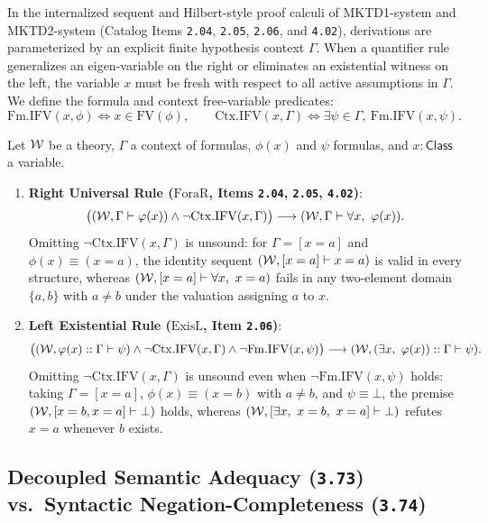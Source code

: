 In the internalized sequent and Hilbert-style proof calculi of \textsf{MKTD1-system} and \textsf{MKTD2-system} (Catalog Items \texttt{2.04}, \texttt{2.05}, \texttt{2.06}, and \texttt{4.02}), derivations are parameterized by an explicit finite hypothesis context $\Gamma$. When a quantifier rule generalizes an eigen-variable on the right or eliminates an existential witness on the left, the variable $x$ must be fresh with respect to all active assumptions in $\Gamma$. We define the formula and context free-variable predicates:
\[
\mathrm{Fm.IFV}(x, \phi) \iff x \in \mathrm{FV}(\phi),
\qquad
\mathrm{Ctx.IFV}(x, \Gamma) \iff \exists \psi \in \Gamma,\ \mathrm{Fm.IFV}(x, \psi).
\]

\begin{proposition}
\label{prop:ctx_ifv_quantifier_hygiene}
Let ${\mathcal{W}}$ be a theory, $\Gamma$ a context of formulas, $\phi(x)$ and $\psi$ formulas, and $x:\mathsf{Class}$ a variable.
\begin{enumerate}
  \item \textbf{Right Universal Rule ($\mathrm{ForaR}$, Items \texttt{2.04}, \texttt{2.05}, \texttt{4.02})}:
  \[
  \big(({\mathcal{W}}, \Gamma \vdash \varphi(x)) \land \neg \mathrm{Ctx.IFV}(x, \Gamma)\big)
  \longrightarrow
  ({\mathcal{W}}, \Gamma \vdash \forall x,\ \varphi(x)).
  \]
  Omitting $\neg \mathrm{Ctx.IFV}(x, \Gamma)$ is unsound: for $\Gamma = [x = a]$ and $\phi(x) \equiv (x = a)$, the identity sequent $({\mathcal{W}}, [x = a] \vdash x = a)$ is valid in every structure, whereas $({\mathcal{W}}, [x = a] \vdash \forall x,\ x = a)$ fails in any two-element domain $\{a, b\}$ with $a \neq b$ under the valuation assigning $a$ to $x$.
  \item \textbf{Left Existential Rule ($\mathrm{ExisL}$, Item \texttt{2.06})}:
  \[
  \big(({\mathcal{W}}, \varphi(x) :: \Gamma \vdash \psi) \land \neg \mathrm{Ctx.IFV}(x, \Gamma) \land \neg \mathrm{Fm.IFV}(x, \psi)\big)
  \longrightarrow
  ({\mathcal{W}}, (\exists x,\ \varphi(x)) :: \Gamma \vdash \psi).
  \]
  Omitting $\neg \mathrm{Ctx.IFV}(x, \Gamma)$ is unsound even when $\neg \mathrm{Fm.IFV}(x, \psi)$ holds: taking $\Gamma = [x = a]$, $\phi(x) \equiv (x = b)$ with $a \neq b$, and $\psi \equiv \bot$, the premise $({\mathcal{W}}, [x = b, x = a] \vdash \bot)$ holds, whereas $({\mathcal{W}}, [\exists x,\ x = b,\ x = a] \vdash \bot)$ refutes $x = a$ whenever $b$ exists.
\end{enumerate}
\end{proposition}

\subsection{Decoupled Semantic Adequacy (\texttt{3.73}) vs.\ Syntactic Negation-Completeness (\texttt{3.74})}
\label{subsec:semantic_vs_negation_completeness}

